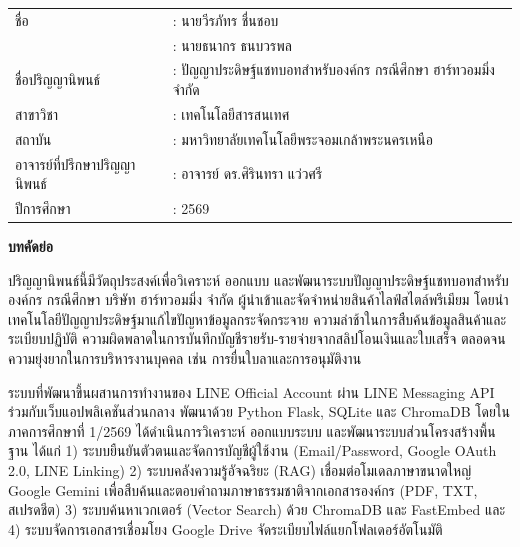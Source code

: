 {}

\vspace*{-0.85in}

{\renewcommand{\arraystretch}{0.75}
\begin{tabularx}{\textwidth}{l L}
ชื่อ                           & : นายวีรภัทร ชื่นชอบ\\
                             & : นายธนากร ธนบวรพล\\
ชื่อปริญญานิพนธ์                  & : ปัญญาประดิษฐ์แชทบอทสำหรับองค์กร กรณีศึกษา ฮาร์ทวอมมิ่ง จำกัด\\
สาขาวิชา                       & : เทคโนโลยีสารสนเทศ\\
สถาบัน                         & : มหาวิทยาลัยเทคโนโลยีพระจอมเกล้าพระนครเหนือ\\
อาจารย์ที่ปรึกษาปริญญานิพนธ์        & : อาจารย์ ดร.ศิรินทรา แว่วศรี\\
ปีการศึกษา                     & : 2569\\
\end{tabularx}
}

\vspace{-2mm}
\begin{center}\textbf{บทคัดย่อ}\end{center}
\vspace{-3mm}

\hspace*{1.5em}ปริญญานิพนธ์นี้มีวัตถุประสงค์เพื่อวิเคราะห์ ออกแบบ และพัฒนาระบบปัญญาประดิษฐ์แชทบอทสำหรับองค์กร กรณีศึกษา บริษัท ฮาร์ทวอมมิ่ง จำกัด ผู้นำเข้าและจัดจำหน่ายสินค้าไลฟ์สไตล์พรีเมียม โดยนำเทคโนโลยีปัญญาประดิษฐ์มาแก้ไขปัญหาข้อมูลกระจัดกระจาย ความล่าช้าในการสืบค้นข้อมูลสินค้าและระเบียบปฏิบัติ ความผิดพลาดในการบันทึกบัญชีรายรับ-รายจ่ายจากสลิปโอนเงินและใบเสร็จ ตลอดจนความยุ่งยากในการบริหารงานบุคคล เช่น การยื่นใบลาและการอนุมัติงาน

\hspace*{1.5em}ระบบที่พัฒนาขึ้นผสานการทำงานของ LINE Official Account ผ่าน LINE Messaging API ร่วมกับเว็บแอปพลิเคชันส่วนกลาง พัฒนาด้วย Python Flask, SQLite และ ChromaDB โดยในภาคการศึกษาที่ 1/2569 ได้ดำเนินการวิเคราะห์ ออกแบบระบบ และพัฒนาระบบส่วนโครงสร้างพื้นฐาน ได้แก่ 1) ระบบยืนยันตัวตนและจัดการบัญชีผู้ใช้งาน (Email/Password, Google OAuth 2.0, LINE Linking) 2) ระบบคลังความรู้อัจฉริยะ (RAG) เชื่อมต่อโมเดลภาษาขนาดใหญ่ Google Gemini เพื่อสืบค้นและตอบคำถามภาษาธรรมชาติจากเอกสารองค์กร (PDF, TXT, สเปรดชีต) 3) ระบบค้นหาเวกเตอร์ (Vector Search) ด้วย ChromaDB และ FastEmbed และ 4) ระบบจัดการเอกสารเชื่อมโยง Google Drive จัดระเบียบไฟล์แยกโฟลเดอร์อัตโนมัติ


